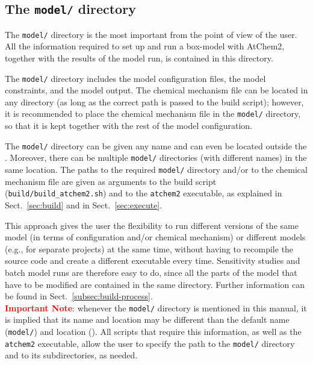 \subsection{The \texttt{model/} directory} \label{subsec:model-directory}

The \texttt{model/} directory is the most important from the point of
view of the user. All the information required to set up and run a
box-model with AtChem2, together with the results of the model run, is
contained in this directory.

The \texttt{model/} directory includes the model configuration files,
the model constraints, and the model output. The chemical mechanism
file can be located in any directory (as long as the correct path is
passed to the build script); however, it is recommended to place the
chemical mechanism file in the \texttt{model/} directory, so that it
is kept together with the rest of the model configuration.

The \texttt{model/} directory can be given any name and can even be
located outside the \maindir. Moreover, there can be multiple
\texttt{model/} directories (with different names) in the same
location. The paths to the required \texttt{model/} directory and/or
to the chemical mechanism file are given as arguments to the build
script (\texttt{build/build\_atchem2.sh}) and to the \texttt{atchem2}
executable, as explained in Sect.~\ref{sec:build} and in
Sect.~\ref{sec:execute}.

This approach gives the user the flexibility to run different versions
of the same model (in terms of configuration and/or chemical
mechanism) or different models (e.g., for separate projects) at the
same time, without having to recompile the source code and create a
different executable every time. Sensitivity studies and batch model
runs are therefore easy to do, since all the parts of the model that
have to be modified are contained in the same directory. Further
information can be found in Sect.~\ref{subsec:build-process}.\\

\textcolor{red}{\bf Important Note}: whenever the \texttt{model/}
directory is mentioned in this manual, it is implied that its name and
location may be different than the default name (\texttt{model/}) and
location (\maindir). All scripts that require this information, as
well as the \texttt{atchem2} executable, allow the user to specify the
path to the \texttt{model/} directory and to its subdirectories, as
needed.

